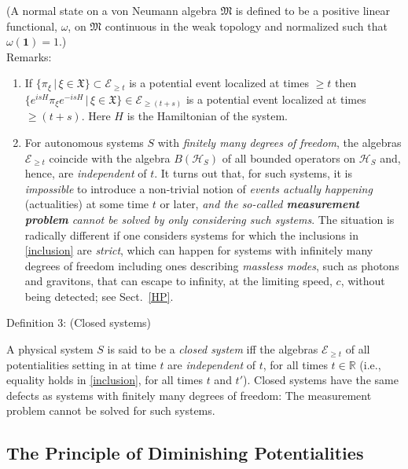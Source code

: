 \documentclass[12pt]{article}
\begin{document}
\noindent
(A normal state on a von Neumann algebra $\mathfrak{M}$ is defined to be a positive linear
functional, $\omega$, on $\mathfrak{M}$ continuous in the weak topology and normalized such that $\omega(\mathbf{1})=1$.)\\

{Remarks}:
\begin{enumerate}
\item{If $\big\{ \pi_{\xi}\, \vert \,\xi \in \mathfrak{X} \big\} \subset \mathcal{E}_{\geq t}$ is a potential event localized at times
$\geq t$ then $\big\{ e^{isH}\pi_{\xi} e^{-isH} \,\vert\, \xi \in \mathfrak{X} \big\} \in \mathcal{E}_{\geq (t+s)} $ is a
potential event localized at times $\geq (t+s)$. Here $H$ is the Hamiltonian of the system.}
\item{For autonomous systems $S$ with \textit{finitely many degrees of freedom}, the algebras $\mathcal{E}_{\geq t}$ coincide with
the algebra $B(\mathcal{H}_S)$ of all bounded operators on $\mathcal{H}_S$ and, hence, are \textit{independent} of $t$. It
turns out that, for such systems, it is \textit{impossible} to introduce a non-trivial notion of \textit{events actually happening}
(actualities) at some time $t$ or later, \textit{and the so-called {\bf{measurement problem}} cannot be solved by only considering such systems}.
The situation is radically different if one considers systems for which the inclusions in \eqref{inclusion} are \textit{strict}, which
can happen for systems with infinitely many degrees of freedom including ones describing \textit{massless modes}, such as photons and gravitons,
that can escape to infinity, at the limiting speed, $c$, without being detected; see Sect.~\ref{HP}.}
\end{enumerate}

 {Definition 3}: (Closed systems)

 A physical system $S$ is said to be a \textit{closed system} iff the algebras $\mathcal{E}_{\geq t}$ of all potentialities
 setting in at time $t$ are \textit{independent} of $t$, for all times $t\in \mathbb{R}$
 (i.e., equality holds in \eqref{inclusion}, for all times $t$ and $t'$). Closed systems
 have the same defects as systems with finitely many degrees of freedom: The
 measurement problem cannot be solved for such systems.

 \subsection{The Principle of Diminishing Potentialities}
\end{document}
